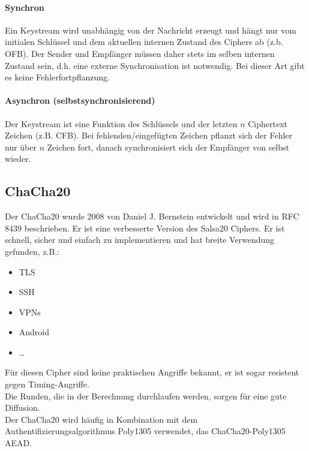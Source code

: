 \paragraph{Synchron}

Ein Keystream wird unabhängig von der Nachricht erzeugt und hängt nur vom initialen Schlüssel und dem aktuellen internen Zustand des Ciphers ab (z.b. OFB).
Der Sender und Empfänger müssen daher stets im selben internen Zustand sein, d.h. eine externe Synchronisation ist notwendig.
Bei dieser Art gibt es keine Fehlerfortpflanzung.

\paragraph{Asynchron (selbstsynchronisierend)}

Der Keystream ist eine Funktion des Schlüssels und der letzten $n$ Ciphertext Zeichen (z.B. CFB).
Bei fehlenden/eingefügten Zeichen pflanzt sich der Fehler nur über $n$ Zeichen fort,
danach synchronisiert sich der Empfänger von selbst wieder.

\subsection{ChaCha20}

Der ChaCha20 wurde 2008 von Daniel J. Bernstein entwickelt und wird in RFC 8439 beschrieben. Er ist eine verbesserte Version des Salsa20 Ciphers.
Er ist schnell, sicher und einfach zu implementieren und hat breite Verwendung gefunden, z.B.: 

\begin{itemize}
    \item TLS
    \item SSH 
    \item VPNs 
    \item Android 
    \item \ldots
\end{itemize}

\noindent Für diesen Cipher sind keine praktischen Angriffe bekannt, er ist sogar resistent gegen Timing-Angriffe.\\

\noindent Die Runden, die in der Berechnung durchlaufen werden, sorgen für eine gute Diffusion. \\

\noindent Der ChaCha20 wird häufig in Kombination mit dem Authentifizierungsalgorithmus Poly1305  verwendet, das ChaCha20-Poly1305 AEAD. \\

